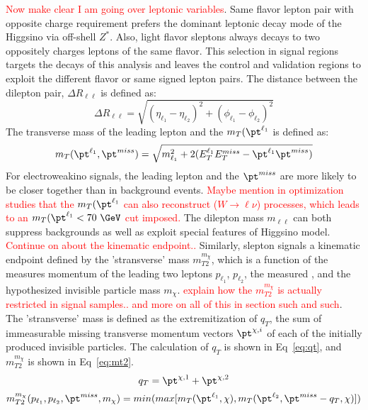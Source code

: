 \textcolor{red}{Now make clear I am going over leptonic variables}.  Same flavor lepton pair with opposite charge requirement prefers the dominant leptonic decay mode of the Higgsino via off-shell $Z^*$.  Also, light flavor sleptons always decays to two oppositely charges leptons of the same flavor.  This selection in signal regions targets the decays of this analysis and leaves the control and validation regions to exploit the different flavor or same signed lepton pairs.  The distance between the dilepton pair, $\Delta R_{\ell\ell}$ is defined as:
\begin{equation}
\Delta R_{\ell\ell} = \sqrt{(\eta_{\ell_1}-\eta_{\ell_2})^2+(\phi_{\ell_1}-\phi_{\ell_2})^2}
\end{equation} 
The transverse mass of the leading lepton and the \met{} $m_T(\pt^{\ell_1}$ is defined as:
\begin{equation}
\label{eq:mt}
m_T(\pt^{\ell_1}, \pt^{miss}) = \sqrt{m^2_{\ell_1}+2(E^{\ell_1}_TE^{miss}_T-\pt^{\ell_1}\pt^{miss})} 
\end{equation}
For electroweakino signals, the leading lepton and the $\pt^{miss}$ are more likely to be closer together than in background events.  \textcolor{red}{Maybe mention in optimization studies that the $m_T(\pt^{\ell_1}$ can also reconstruct ($W\rightarrow\ell\nu$) processes, which leads to an $m_T(\pt^{\ell_1} < 70~\GeV$ cut imposed.}
The dilepton mass $m_{\ell\ell}$ can both suppress backgrounds as well as exploit special features of Higgsino model.  \textcolor{red}{Continue on about the kinematic endpoint..}  Similarly, slepton signals a kinematic endpoint defined by the 'stransverse' mass $m^{m_\chi}_{T2}$, which is a function of the measures momentum of the leading two leptons $p_{\ell_1}$, $p_{\ell_2}$, the measured \pt, and the hypothesized invisible particle mass $m_\chi$.  \textcolor{red}{explain how the $m^{m_\chi}_{T2}$ is actually restricted in signal samples.. and more on all of this in section such and such}.  The 'stransverse' mass is defined as the extremitization of $q_T$, the sum of immeasurable missing transverse momentum vectors $\pt^{\chi,i}$ of each of the initially produced invisible particles.  The calculation of $q_T$ is shown in Eq~\ref{eq:qt}, and $m^{m_\chi}_{T2}$ is shown in Eq~\ref{eq:mt2}.
\begin{equation}
\label{eq:qt}
q_T = \pt^{\chi,1}+\pt^{\chi,2}
\end{equation}
\begin{equation}
\label{eq:mt2}
m^{m_\chi}_{T2}(p_{\ell_1}, p_{\ell_2}, \pt^{miss}, m_\chi)  = min(max[m_T(\pt^{\ell_1}, \chi), m_T(\pt^{\ell_2}, \pt^{miss}-q_T, \chi)])
\end{equation}
